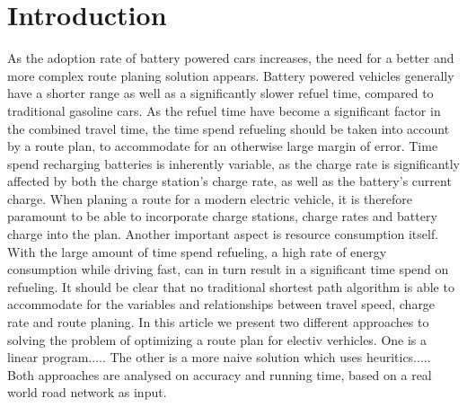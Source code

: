 \section{Introduction}
	As the adoption rate of battery powered cars increases, the need for a better and more complex route planing solution appears. Battery powered vehicles generally have a shorter range as well as a significantly slower refuel time, compared to traditional gasoline cars. As the refuel time have become a significant factor in the combined travel time, the time spend refueling should be taken into account by a route plan, to accommodate for an otherwise large margin of error.
	Time spend recharging batteries is inherently variable, as the charge rate is significantly affected by both the charge station’s charge rate, as well as the battery’s current charge. When planing a route for a modern electric vehicle, it is therefore paramount to be able to incorporate charge stations, charge rates and battery charge into the plan.
	Another important aspect is resource consumption itself. With the large amount of time spend refueling, a high rate of energy consumption while driving fast, can in turn result in a significant time spend on refueling.
	It should be clear that no traditional shortest path algorithm is able to accommodate for the variables and relationships between travel speed, charge rate and route planing. In this article we present two different approaches to solving the problem of optimizing a route plan for electiv verhicles. One is a linear program..... The other is a more naive solution which uses heuritics..... Both approaches are analysed on accuracy and running time, based on a real world road network as input.


